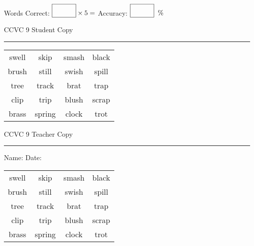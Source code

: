 \documentclass{memoir}
\begin{document}
\normalsize

Words Correct: $\fbox{\phantom{\huge 100}} \times 5 = $ Accuracy: $\fbox{\phantom{\huge 100}}\;\; \%$ 

\vfill

\newpage


\footnotesize \noindent
CCVC 9 \hfill Student Copy
\smallskip
\hrule

\Large

\setlength{\tabcolsep}{14pt}
\def\arraystretch{3}

{\selectfont


\begin{vplace}[0.5]
\begin{center}
\begin{tabular}{cccc}
swell & skip & smash & black            \\
brush & still & swish & spill \\
tree & track       & brat               & trap \\
clip & trip & blush & scrap \\
brass       & spring & clock & trot \\
\end{tabular}
\end{center}
\end{vplace}

}

\newpage

\footnotesize \noindent
CCVC 9 \hfill Teacher Copy
\smallskip
\hrule

\normalsize

\vfill

\noindent
Name: \underline{\hspace{1.75in}} \hfill Date: \underline{\hspace{1in}}

\Large

{\selectfont


\begin{vplace}[0.5]
\begin{center}
\begin{tabular}{cccc}
swell & skip & smash & black            \\
brush & still & swish & spill \\
tree & track       & brat               & trap \\
clip & trip & blush & scrap \\
brass       & spring & clock & trot \\
\end{tabular}
\end{center}
\end{vplace}



}
\end{document}
